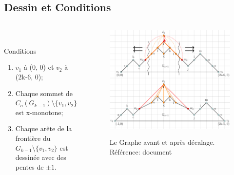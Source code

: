 \documentclass[10pt]{beamer}
\begin{document}
\subsection{Dessin et Conditions}	
{
\begin{frame}{}
\begin{columns}
	\begin{column}{0.3\textwidth}
 \\[-2.5cm]
\begin{block}{Conditions}
	\begin{enumerate}
		\item \footnotesize $v_1$ à (0, 0) et $v_2$ à (2k-6, 0);\\[.5cm]
		\item \footnotesize Chaque sommet de $C_o(G_{k-1}) \setminus \{v_1, v_2\}$ est x-monotone;	\\[.5cm]
		\item \footnotesize Chaque arête de la frontière du $G_{k-1} \setminus \{v_1, v_2\}$ est dessinée avec des pentes de $\pm 1$. 
	\end{enumerate} 
\end{block}	
	\end{column}
	\begin{column}{0.9\textheight}
			\begin{figure}
			\centering
			\includegraphics[height=.76\textheight]{sm1.png}\\[-.2cm]
\caption[caption]{Le Graphe avant et après décalage. \\\vspace*{0.1cm} Référence: document \citeauthor{TakaoSaidur}}	   
		\end{figure}
	\end{column}
\end{columns}
	
\end{frame}
}
\end{document}

